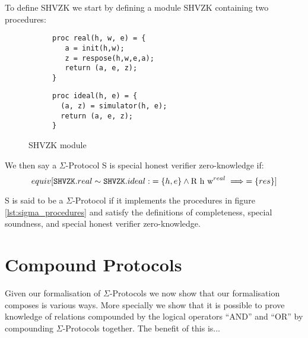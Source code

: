 \begin{definition}
  To define SHVZK we start by defining a module SHVZK containing two procedures:
\label{def:sigma:shvzk}
  \begin{figure}[ht]
    \centering
    \begin{subfigure}{0.48\textwidth }
\begin{lstlisting}[mathescape]
proc real(h, w, e) = {
   a = init(h,w);
   z = respose(h,w,e,a);
   return (a, e, z);
}
\end{lstlisting}
    \end{subfigure}
    \hfill
    \begin{subfigure}{0.48\textwidth }
\begin{lstlisting}[mathescape]
proc ideal(h, e) = {
  (a, z) = simulator(h, e);
  return (a, e, z);
}
\end{lstlisting}
    \end{subfigure}
    \caption{SHVZK module}
  \end{figure}
  We then say a $\Sigma$-Protocol S is special honest verifier zero-knowledge
  if:
  \[
    equiv[\texttt{SHVZK}.real \sim \texttt{SHVZK}.ideal :\; =\{h, e\} \land \text{R
    h w}^{real} \implies =\{res\}]
  \]
\end{definition}

\begin{definition}
\label{def:sigma-protocol}
  S is said to be a $\Sigma$-Protocol if it implements the procedures in figure
  \ref{lst:sigma_procedures} and satisfy the definitions of completeness,
  special soundness, and special honest verifier zero-knowledge.
\end{definition}




\section{Compound Protocols}
\label{sec:sigma_comp}
Given our formalisation of $\Sigma$-Protocols we now show that our formalisation
composes is various ways. More specially we show that it is possible to prove knowledge of
relations compounded by the logical operators ``AND'' and ``OR'' by compounding
$\Sigma$-Protocols together.
The benefit of this is...

